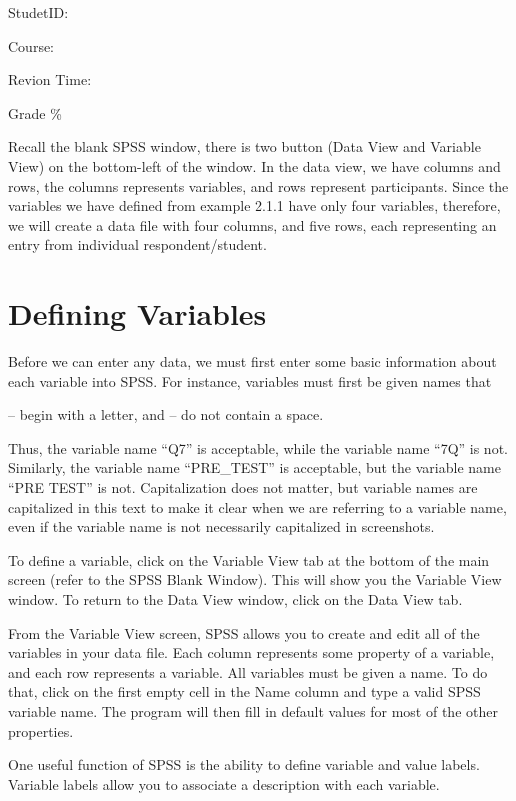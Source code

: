 \documentclass[
]{book}
\begin{document}
StudetID:

Course:

Revion Time:

Grade \%

Recall the blank SPSS window, there is two button (Data View and Variable View) on the bottom-left of the window. In the data view, we have columns and rows, the columns represents variables, and rows represent participants. Since the variables we have defined from example 2.1.1 have only four variables, therefore, we will create a data file with four columns, and five rows, each representing an entry from individual respondent/student.

\hypertarget{defining-variables}{%
\section{Defining Variables}\label{defining-variables}}

Before we can enter any data, we must first enter some basic information about each variable into SPSS. For instance, variables must first be given names that

-- begin with a letter, and
-- do not contain a space.

Thus, the variable name ``Q7'' is acceptable, while the variable name ``7Q'' is not. Similarly, the variable name ``PRE\_TEST'' is acceptable, but the variable name ``PRE TEST'' is not. Capitalization does not matter, but variable names are capitalized in this text to make it clear when we are referring to a variable name, even if the variable name is not necessarily capitalized in screenshots.

To define a variable, click on the Variable View tab at the bottom of the main screen (refer to the SPSS Blank Window). This will show you the Variable View window. To return to the Data View window, click on the Data View tab.

From the Variable View screen, SPSS allows you to create and edit all of the variables in your data file. Each column represents some property of a variable, and each row represents a variable. All variables must be given a name. To do that, click on the first empty cell in the Name column and type a valid SPSS variable name. The program will then fill in default values for most of the other properties.

One useful function of SPSS is the ability to define variable and value labels. Variable labels allow you to associate a description with each variable.
\end{document}
